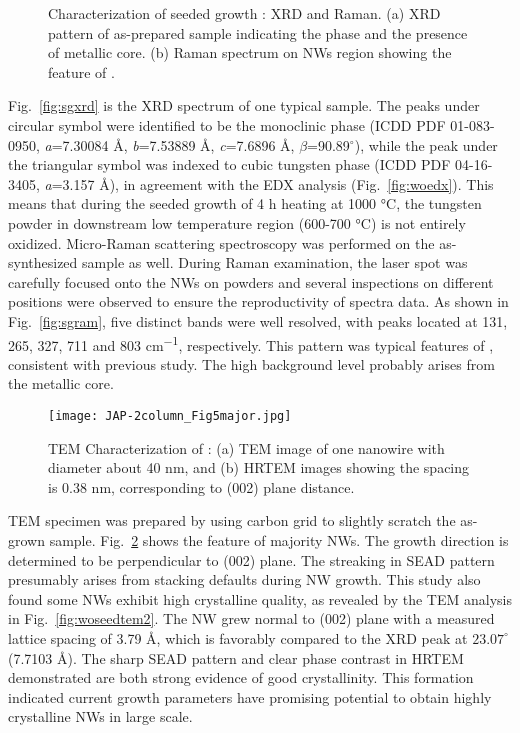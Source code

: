 \begin{figure}[htb]
\centering
{}\hspace{0.04\textwidth}
\caption[Characterization of seeded growth : XRD and Raman]{Characterization of seeded growth : XRD and Raman. (a) XRD pattern of as-prepared sample indicating the  phase and the presence of metallic core. (b) Raman spectrum on NWs region showing the feature of .}
\label{fig:woseedxrd}
\end{figure}

Fig.~\ref{fig:sgxrd} is the XRD spectrum of one typical sample. The peaks under circular symbol were identified to be the monoclinic  phase (ICDD PDF 01-083-0950, \emph{a}=7.30084 \AA, \emph{b}=7.53889 \AA, \emph{c}=7.6896 \AA, $\beta$=90.89$^\circ$), while the peak under the triangular symbol was indexed to cubic tungsten phase (ICDD PDF 04-16-3405, \emph{a}=3.157 \AA), in agreement with the EDX analysis (Fig.~\ref{fig:woedx}). This means that during the  seeded growth of 4 h heating at 1000 \si{\degreeCelsius}, the tungsten powder in downstream low temperature region (600-700 \si{\degreeCelsius}) is not entirely oxidized. Micro-Raman scattering spectroscopy was performed on the as-synthesized sample as well. During Raman examination, the laser spot was carefully focused onto the NWs on powders and several inspections on different positions were observed to ensure the reproductivity of spectra data. As shown in Fig.~\ref{fig:sgram}, five distinct bands were well resolved, with peaks located at 131, 265, 327, 711 and 803 \si{cm^{-1}}, respectively. This pattern was typical features of , consistent with previous study.\cite{Salje1975a,Dixit1986} The high background level probably arises from the metallic core.
\begin{figure}[htb]
\centering
\texttt{[image: JAP-2column\_Fig5major.jpg]}
\caption[Characterization of : TEM]{TEM Characterization of : (a) TEM image of one nanowire with diameter about 40 nm, and (b) HRTEM images showing the spacing is 0.38 nm, corresponding to (002) plane distance.}
\label{fig:woseedtem1}
\end{figure}

TEM specimen was prepared by using carbon grid to slightly scratch the as-grown sample. Fig.~\ref{fig:woseedtem1} shows the feature of majority NWs. The growth direction is determined to be perpendicular to (002) plane. The streaking in SEAD pattern presumably arises from stacking defaults during  NW growth. This study also found some NWs exhibit high crystalline quality, as revealed by the TEM analysis in Fig.~\ref{fig:woseedtem2}. The NW grew normal to (002) plane with a measured lattice spacing of 3.79 \AA, which is favorably compared to the XRD peak at $23.07^\circ$ (7.7103 \AA). The sharp SEAD pattern and clear phase contrast in HRTEM demonstrated are both strong evidence of good crystallinity. This formation indicated current growth parameters have promising potential to obtain highly crystalline  NWs in large scale. 

